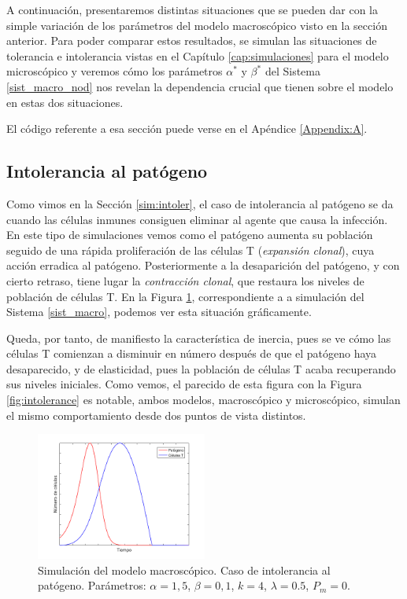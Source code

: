 A continuación, presentaremos distintas situaciones que se pueden dar con la simple variación de los parámetros del modelo macroscópico visto en la sección anterior. Para poder comparar estos resultados, se simulan las situaciones de tolerancia e intolerancia vistas en el Capítulo \ref{cap:simulaciones} para el modelo microscópico y veremos cómo los parámetros $\alpha^{*}$ y $\beta^{*}$ del Sistema \ref{sist_macro_nod} nos revelan la dependencia crucial que tienen sobre el modelo en estas dos situaciones.

El código referente a esa sección puede verse en el Apéndice \ref{Appendix:A}.



\subsection{Intolerancia al patógeno}
\label{sub:simMacroIntoler}

Como vimos en la Sección \ref{sim:intoler}, el caso de intolerancia al patógeno se da cuando las células inmunes consiguen eliminar al agente que causa la infección. 
En este tipo de simulaciones vemos como el patógeno aumenta su población seguido de una rápida proliferación de las células T (\textit{expansión clonal}), cuya acción erradica al patógeno. Posteriormente a la desaparición del patógeno, y con cierto retraso, tiene lugar la \textit{contracción clonal}, que restaura los niveles de población de células T. En la Figura \ref{fig:macro_intolerance}, correspondiente a a simulación del Sistema \ref{sist_macro}, podemos ver esta situación gráficamente. 

Queda, por tanto, de manifiesto la característica de inercia, pues se ve cómo las células T comienzan a disminuir en número después de que el patógeno haya desaparecido, y de elasticidad, pues la población de células T acaba recuperando sus niveles iniciales. Como vemos, el parecido de esta figura con la Figura \ref{fig:intolerance} es notable, ambos modelos, macroscópico y microscópico, simulan el mismo comportamiento desde dos puntos de vista distintos.

\begin{figure}[t]
	\centering
	\includegraphics[width=0.5\textwidth]{Imagenes/Simulaciones/macro_intoler}
	\caption{Simulación del modelo macroscópico. Caso de intolerancia al patógeno. Parámetros: $\alpha=1,5$, $\beta=0,1$, $k=4$, $\lambda=0.5$, $P_m = 0$.}
	\label{fig:macro_intolerance}
\end{figure}




